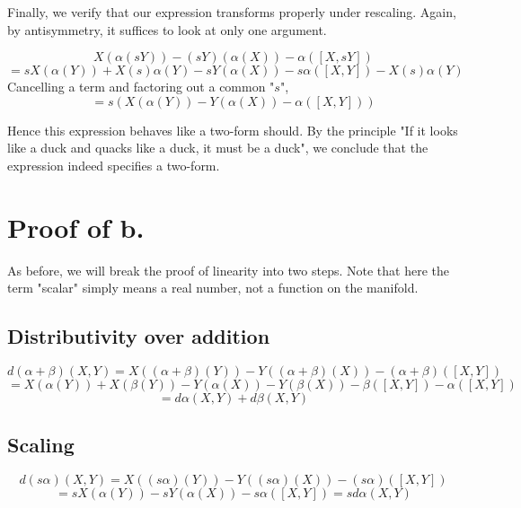 \documentclass[12pt]{article}
\begin{document}
Finally, we verify that our expression transforms properly under rescaling.  Again, by antisymmetry, it suffices to look at only one argument.

\[  X(\alpha(sY)) - (sY)(\alpha(X)) - \alpha([X,sY]) \]
\[  = sX(\alpha(Y)) + X(s) \alpha(Y) - sY(\alpha(X)) - s \alpha([X,Y]) -  X(s) \alpha(Y)\]
Cancelling a term and factoring out a common "$s$", 
\[  = s \left( X(\alpha(Y)) - Y(\alpha(X)) - \alpha([X,Y]) \right) \]

Hence this expression behaves like a two-form should.  By the principle "If it looks like a duck and quacks like a duck, it must be a duck", we conclude that the expression indeed specifies a two-form.

\section{Proof of b.}

As before, we will break the proof of linearity into two steps.  Note that here the term "scalar" simply means a real number, not a function on the manifold.

\subsection{Distributivity over addition}

\[ d(\alpha + \beta) (X,Y) = X((\alpha + \beta)(Y)) - Y((\alpha + \beta)(X))  - (\alpha + \beta)([X,Y]) \]
\[ = X(\alpha(Y)) + X(\beta(Y)) - Y(\alpha(X)) - Y(\beta (X))- \beta([X,Y]) - \alpha([X,Y]) \]
\[ = d \alpha (X,Y) + d \beta (X,Y) \]

\subsection{Scaling}

\[ d(s \alpha) (X,Y) = X((s \alpha)(Y)) - Y((s \alpha)(X))  - (s \alpha)([X,Y]) \]
\[ = s X(\alpha(Y))  - s Y(\alpha(X)) - s \alpha([X,Y]) = s d\alpha (X,Y)\]
\end{document}
